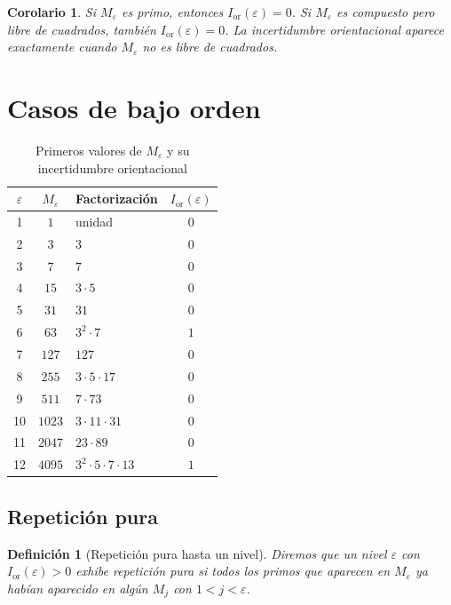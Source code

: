\documentclass[11pt]{article}
\newtheorem{definicion}{Definición}
\newtheorem{corolario}{Corolario}
\newcommand{\Ior}{I_{\mathrm{or}}}
\begin{document}
\begin{corolario}
Si $M_\varepsilon$ es primo, entonces $\Ior(\varepsilon)=0$. Si $M_\varepsilon$ es compuesto pero libre de cuadrados, también $\Ior(\varepsilon)=0$. La incertidumbre orientacional aparece exactamente cuando $M_\varepsilon$ no es libre de cuadrados.
\end{corolario}

\clearpage
\section{Casos de bajo orden}

\begin{table}[h]
\centering
\caption{Primeros valores de $M_\varepsilon$ y su incertidumbre orientacional}
\label{tab:primeros}
\begin{tabular}{cclc}
\toprule
$\varepsilon$ & $M_\varepsilon$ & Factorización & $\Ior(\varepsilon)$\\
\midrule
1 & $1$ & unidad & $0$\\
2 & $3$ & $3$ & $0$\\
3 & $7$ & $7$ & $0$\\
4 & $15$ & $3\cdot5$ & $0$\\
5 & $31$ & $31$ & $0$\\
6 & $63$ & $3^2\cdot7$ & $1$\\
7 & $127$ & $127$ & $0$\\
8 & $255$ & $3\cdot5\cdot17$ & $0$\\
9 & $511$ & $7\cdot73$ & $0$\\
10 & $1023$ & $3\cdot11\cdot31$ & $0$\\
11 & $2047$ & $23\cdot89$ & $0$\\
12 & $4095$ & $3^2\cdot5\cdot7\cdot13$ & $1$\\
\bottomrule
\end{tabular}
\end{table}

\subsection{Repetición pura}

\begin{definicion}[Repetición pura hasta un nivel]\label{def:repeticion-pura}
Diremos que un nivel $\varepsilon$ con $\Ior(\varepsilon)>0$ exhibe \emph{repetición pura} si todos los primos que aparecen en $M_\varepsilon$ ya habían aparecido en algún $M_j$ con $1<j<\varepsilon$.
\end{definicion}
\end{document}
